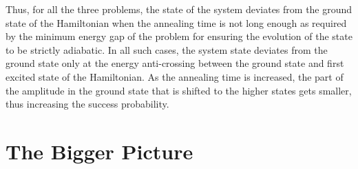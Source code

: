 \documentclass[../main.tex]{subfiles}
\begin{document}

Thus, for all the three problems, the state of the system deviates from the ground  state of the Hamiltonian when the annealing time is not long enough as required by the minimum energy gap of the problem for ensuring the evolution of the state to be strictly adiabatic. In all such cases, the system state deviates from the ground state only at the energy anti-crossing between the ground state and first excited state of the Hamiltonian. As the annealing time is increased, the part of the amplitude in the ground state that is shifted to the higher states gets smaller, thus increasing the success probability.

\section{The Bigger Picture}
\end{document}
